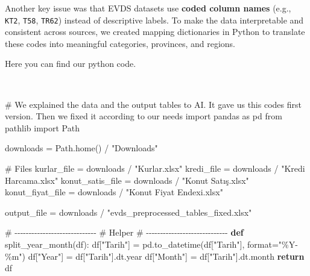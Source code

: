 \documentclass[
  11pt,
  a4paper,
]{article}
\newenvironment{Shaded}{\begin{snugshade}}{\end{snugshade}}
\newcommand{\BuiltInTok}[1]{\textcolor[rgb]{0.00,0.23,0.31}{#1}}
\newcommand{\CommentTok}[1]{\textcolor[rgb]{0.37,0.37,0.37}{#1}}
\newcommand{\ControlFlowTok}[1]{\textcolor[rgb]{0.00,0.23,0.31}{\textbf{#1}}}
\newcommand{\ImportTok}[1]{\textcolor[rgb]{0.00,0.46,0.62}{#1}}
\newcommand{\KeywordTok}[1]{\textcolor[rgb]{0.00,0.23,0.31}{\textbf{#1}}}
\newcommand{\NormalTok}[1]{\textcolor[rgb]{0.00,0.23,0.31}{#1}}
\newcommand{\OperatorTok}[1]{\textcolor[rgb]{0.37,0.37,0.37}{#1}}
\newcommand{\StringTok}[1]{\textcolor[rgb]{0.13,0.47,0.30}{#1}}
\begin{document}
Another key issue was that EVDS datasets use \textbf{coded column names}
(e.g., \texttt{KT2}, \texttt{T58}, \texttt{TR62}) instead of descriptive
labels. To make the data interpretable and consistent across sources, we
created mapping dictionaries in Python to translate these codes into
meaningful categories, provinces, and regions.

Here you can find our python code.\\
\strut \\

\begin{Shaded}
\begin{Highlighting}[]
\CommentTok{\# We explained the data and the output tables to AI. It gave us this code\textquotesingle{}s first version. Then we fixed it according to our needs}
\ImportTok{import}\NormalTok{ pandas }\ImportTok{as}\NormalTok{ pd}
\ImportTok{from}\NormalTok{ pathlib }\ImportTok{import}\NormalTok{ Path}

\NormalTok{downloads }\OperatorTok{=}\NormalTok{ Path.home() }\OperatorTok{/} \StringTok{"Downloads"}

\CommentTok{\# Files}
\NormalTok{kurlar\_file }\OperatorTok{=}\NormalTok{ downloads }\OperatorTok{/} \StringTok{"Kurlar.xlsx"}
\NormalTok{kredi\_file }\OperatorTok{=}\NormalTok{ downloads }\OperatorTok{/} \StringTok{"Kredi Harcama.xlsx"}
\NormalTok{konut\_satis\_file }\OperatorTok{=}\NormalTok{ downloads }\OperatorTok{/} \StringTok{"Konut Satış.xlsx"}
\NormalTok{konut\_fiyat\_file }\OperatorTok{=}\NormalTok{ downloads }\OperatorTok{/} \StringTok{"Konut Fiyat Endexi.xlsx"}

\NormalTok{output\_file }\OperatorTok{=}\NormalTok{ downloads }\OperatorTok{/} \StringTok{"evds\_preprocessed\_tables\_fixed.xlsx"}

\CommentTok{\# {-}{-}{-}{-}{-}{-}{-}{-}{-}{-}{-}{-}{-}{-}{-}{-}{-}{-}{-}{-}{-}{-}{-}{-}{-}{-}{-}{-}{-}}
\CommentTok{\# Helper}
\CommentTok{\# {-}{-}{-}{-}{-}{-}{-}{-}{-}{-}{-}{-}{-}{-}{-}{-}{-}{-}{-}{-}{-}{-}{-}{-}{-}{-}{-}{-}{-}}
\KeywordTok{def}\NormalTok{ split\_year\_month(df):}
\NormalTok{    df[}\StringTok{"Tarih"}\NormalTok{] }\OperatorTok{=}\NormalTok{ pd.to\_datetime(df[}\StringTok{"Tarih"}\NormalTok{], }\BuiltInTok{format}\OperatorTok{=}\StringTok{"\%Y{-}\%m"}\NormalTok{)}
\NormalTok{    df[}\StringTok{"Year"}\NormalTok{] }\OperatorTok{=}\NormalTok{ df[}\StringTok{"Tarih"}\NormalTok{].dt.year}
\NormalTok{    df[}\StringTok{"Month"}\NormalTok{] }\OperatorTok{=}\NormalTok{ df[}\StringTok{"Tarih"}\NormalTok{].dt.month}
    \ControlFlowTok{return}\NormalTok{ df}


\end{Highlighting}
\end{Shaded}
\end{document}
